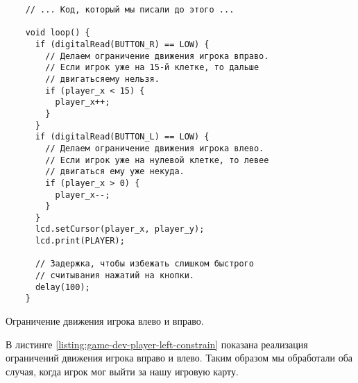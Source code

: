 \documentclass[../sparc.tex]{subfiles}
\begin{document}
\begin{listing}[ht]
  \begin{verbatim}
    // ... Код, который мы писали до этого ...

    void loop() {
      if (digitalRead(BUTTON_R) == LOW) {
        // Делаем ограничение движения игрока вправо.
        // Если игрок уже на 15-й клетке, то дальше
        // двигатьсяему нельзя.
        if (player_x < 15) {
          player_x++;
        }
      }
      if (digitalRead(BUTTON_L) == LOW) {
        // Делаем ограничение движения игрока влево.
        // Если игрок уже на нулевой клетке, то левее
        // двигаться ему уже некуда.
        if (player_x > 0) {
          player_x--;
        }
      }
      lcd.setCursor(player_x, player_y);
      lcd.print(PLAYER);

      // Задержка, чтобы избежать слишком быстрого
      // считывания нажатий на кнопки.
      delay(100);
    }
  \end{verbatim}
  \caption{Ограничение движения игрока влево и вправо.}
  \label{listing:game-dev-player-left-constrain}
\end{listing}

В листинге \ref{listing:game-dev-player-left-constrain} показана реализация
ограничений движения игрока вправо и влево.  Таким образом мы обработали оба
случая, когда игрок мог выйти за нашу игровую карту.
\end{document}
